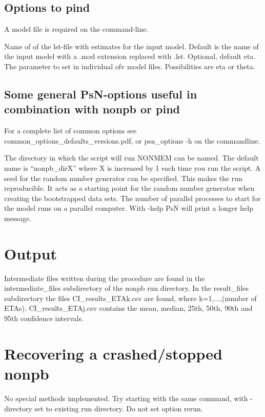 \subsection{Options to pind}
A model file is required on the command-line.

\begin{optionlist}
Name of  of the lst-file with estimates for the input model. Default is the name of the input model with a .mod extension replaced with .lst. 
\nextopt
{}
Optional, default eta. The parameter to set in individual ofv model files. Possibilities are eta or theta. 
\nextopt
\end{optionlist}

\subsection{Some general PsN-options useful in combination with nonpb or pind}

For a complete list of common options see common\_options\_defaults\_versions.pdf, or psn\_options -h on the commandline.

\begin{optionlist}
The directory in which the script will run NONMEM can be named. The default name is “nonpb\_dirX” where X is increased by 1 each time you run the script. 
\nextopt
{}
A seed for the random number generator can be specified. This makes the run reproducible. It acts as a starting point for the random number generator when creating the bootstrapped data sets. 
\nextopt
{}
The number of parallel processes to start for the model runs on a parallel computer. 
\nextopt
{}
With -help PsN will print a longer help message. 
\nextopt
\end{optionlist}

\section{Output}
Intermediate files written during the procedure are found in the intermediate\_files subdirectory of the nonpb run directory. In the result\_files subdirectory the files CI\_results\_ETAk.csv are found, where k=1,...,(number of ETAs). CI\_results\_ETAj.csv contains the mean, median, 25th, 50th, 90th and 95th confidence intervals.

\section{Recovering a crashed/stopped nonpb}
No special methods implemented. Try starting with the same command, with -directory set to existing run directory. Do not set option rerun.

